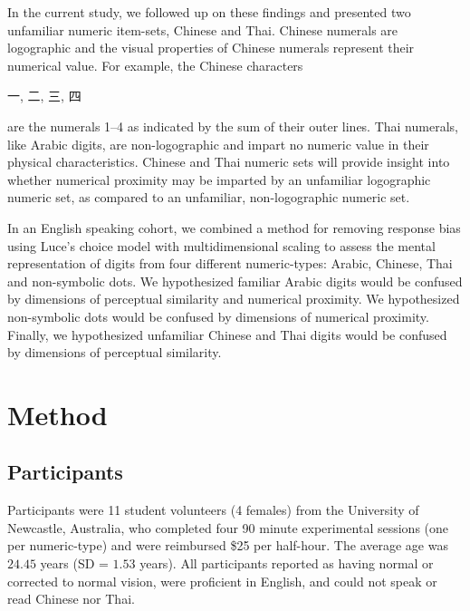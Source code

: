 In the current study, we followed up on these findings and presented two unfamiliar numeric item-sets, Chinese and Thai. Chinese numerals are logographic \cite<each character represents a word or phrase, >{hung1992automatic, shakkour2014cognitive} and the visual properties of Chinese numerals represent their numerical value. For example, the Chinese characters \begin{CJK}{UTF8}{gbsn}一, 二, 三, 四\end{CJK} are the numerals 1--4 as indicated by the sum of their outer lines. Thai numerals, like Arabic digits, are non-logographic and impart no numeric value in their physical characteristics. Chinese and Thai numeric sets will provide insight into whether numerical proximity may be imparted by an unfamiliar logographic numeric set, as compared to an unfamiliar, non-logographic numeric set.

In an English speaking cohort, we combined a method for removing response bias using Luce's choice model with multidimensional scaling to assess the mental representation of digits from four different numeric-types: Arabic, Chinese, Thai and non-symbolic dots. We hypothesized familiar Arabic digits would be confused by dimensions of perceptual similarity and numerical proximity. We hypothesized non-symbolic dots would be confused by dimensions of numerical proximity. Finally, we hypothesized unfamiliar Chinese and Thai digits would be confused by dimensions of perceptual similarity.

\section{Method}
\subsection{Participants}
Participants were 11 student volunteers (4 females) from the University of Newcastle, Australia, who completed four 90 minute experimental sessions (one per numeric-type) and were reimbursed \$25 per half-hour. The average age was $24.45$ years (SD = $1.53$ years). All participants reported as having normal or corrected to normal vision, were proficient in English, and could not speak or read Chinese nor Thai.


